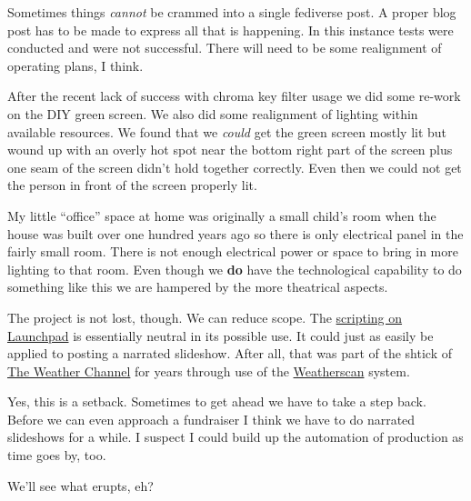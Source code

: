 Sometimes things \emph{cannot} be crammed into a single fediverse post.
A proper blog post has to be made to express all that is happening. In
this instance tests were conducted and were not successful. There will
need to be some realignment of operating plans, I think.

After the recent lack of success with chroma key filter usage we did
some re-work on the DIY green screen. We also did some realignment of
lighting within available resources. We found that we \emph{could} get
the green screen mostly lit but wound up with an overly hot spot near
the bottom right part of the screen plus one seam of the screen didn't
hold together correctly. Even then we could not get the person in front
of the screen properly lit.

My little ``office'' space at home was originally a small child's room
when the house was built over one hundred years ago so there is only
electrical panel in the fairly small room. There is not enough
electrical power or space to bring in more lighting to that room. Even
though we \textbf{do} have the technological capability to do something
like this we are hampered by the more theatrical aspects.

The project is not lost, though. We can reduce scope. The
\href{https://code.launchpad.net/~skellat/+git/show-prep-scripts}{scripting
on Launchpad} is essentially neutral in its possible use. It could just
as easily be applied to posting a narrated slideshow. After all, that
was part of the shtick of
\href{https://en.wikipedia.org/w/index.php?title=The_Weather_Channel&oldid=1130419446}{The
Weather Channel} for years through use of the
\href{https://en.wikipedia.org/w/index.php?title=Weatherscan&oldid=1129582881}{Weatherscan}
system.

Yes, this is a setback. Sometimes to get ahead we have to take a step
back. Before we can even approach a fundraiser I think we have to do
narrated slideshows for a while. I suspect I could build up the
automation of production as time goes by, too.

We'll see what erupts, eh?
